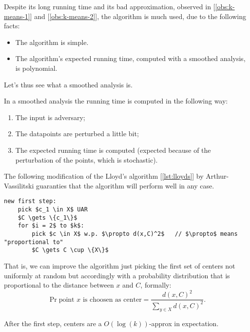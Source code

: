 Despite its long running time and its bad approximation, observed in [\ref{obs:k-means-1}] and [\ref{obs:k-means-2}], the algorithm is much used, due to the following facts:
\begin{itemize}
    \item The algorithm is simple.
    \item The algorithm's expected running time, computed with a smoothed analysis, is polynomial.
\end{itemize}
%
Let's thus see what a smoothed analysis is.
%
\begin{defn}
    In a smoothed analysis the running time is computed in the following way:
    \begin{enumerate}
        \item The input is adversary;
        \item The datapoints are perturbed a little bit;
        \item The expected running time is computed (expected because of the perturbation of the points, which is stochastic).
    \end{enumerate}
\end{defn}

The following modification of the Lloyd's algorithm [\ref{lst:lloyds}] by Arthur-Vassilitski guaranties that the algorithm will perform well in any case.
\begin{lstlisting}[caption={kmeans++}, label={lst:arthurv-assilitski}]
new first step:
    pick $c_1 \in X$ UAR
    $C \gets \{c_1\}$
    for $i = 2$ to $k$:
        pick $c \in X$ w.p. $\propto d(x,C)^2$   // $\propto$ means "proportional to"
        $C \gets C \cup \{X\}$
\end{lstlisting}
That is, we can improve the algorithm just picking the first set of centers not uniformly at random but accordingly with a probability distribution that is proportional to the distance between $x$ and $C$, formally:
\begin{equation}
    \Pr{\text{point $x$ is choosen as center}} = \frac{d(x,C)^2}{\sum_{y \in X} d(x,C)^2}.
\end{equation}

\begin{claim}
    After the first step, centers are a $O(\log(k))$-approx in expectation.
\end{claim}

